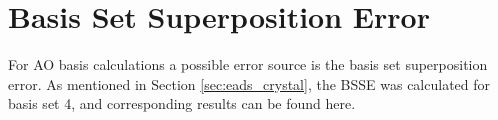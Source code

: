 \documentclass[11pt,DIV=13,BCOR=5mm,a4paper,headinclude]{scrbook}
\begin{document}

\appendix

\captionsetup{labelformat=myformat}
\def\thefigure{A.\arabic{figure}}
\def\thetable{A.\arabic{table}}
\section{Basis Set Superposition Error}\label{app:BSSE}
For AO basis calculations a possible error source is the basis set superposition error.
As mentioned in Section \ref{sec:eads_crystal}, the BSSE was calculated for basis set 4, and corresponding results can be found here.
\end{document}
